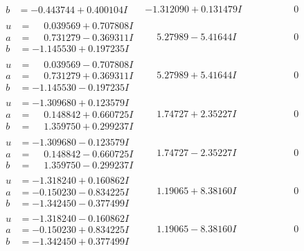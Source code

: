 \documentclass[1p]{elsarticle_modified}
\theoremstyle{definition}
\begin{document}
$$\begin{array}{c|c|c}
\begin{aligned}
b &= -0.443744 + 0.400104 I\end{aligned}
 & -1.312090 + 0.131479 I & \phantom{-0.000000 } 0 \\ \hline\begin{aligned}
u &= \phantom{-}0.039569 + 0.707808 I \\
a &= \phantom{-}0.731279 - 0.369311 I \\
b &= -1.145530 + 0.197235 I\end{aligned}
 & \phantom{-}5.27989 - 5.41644 I & \phantom{-0.000000 } 0 \\ \hline\begin{aligned}
u &= \phantom{-}0.039569 - 0.707808 I \\
a &= \phantom{-}0.731279 + 0.369311 I \\
b &= -1.145530 - 0.197235 I\end{aligned}
 & \phantom{-}5.27989 + 5.41644 I & \phantom{-0.000000 } 0 \\ \hline\begin{aligned}
u &= -1.309680 + 0.123579 I \\
a &= \phantom{-}0.148842 + 0.660725 I \\
b &= \phantom{-}1.359750 + 0.299237 I\end{aligned}
 & \phantom{-}1.74727 + 2.35227 I & \phantom{-0.000000 } 0 \\ \hline\begin{aligned}
u &= -1.309680 - 0.123579 I \\
a &= \phantom{-}0.148842 - 0.660725 I \\
b &= \phantom{-}1.359750 - 0.299237 I\end{aligned}
 & \phantom{-}1.74727 - 2.35227 I & \phantom{-0.000000 } 0 \\ \hline\begin{aligned}
u &= -1.318240 + 0.160862 I \\
a &= -0.150230 - 0.834225 I \\
b &= -1.342450 - 0.377499 I\end{aligned}
 & \phantom{-}1.19065 + 8.38160 I & \phantom{-0.000000 } 0 \\ \hline\begin{aligned}
u &= -1.318240 - 0.160862 I \\
a &= -0.150230 + 0.834225 I \\
b &= -1.342450 + 0.377499 I\end{aligned}
 & \phantom{-}1.19065 - 8.38160 I & \phantom{-0.000000 } 0 \\ \hline\begin{aligned}

\end{aligned}
\end{array}$$
\end{document}
